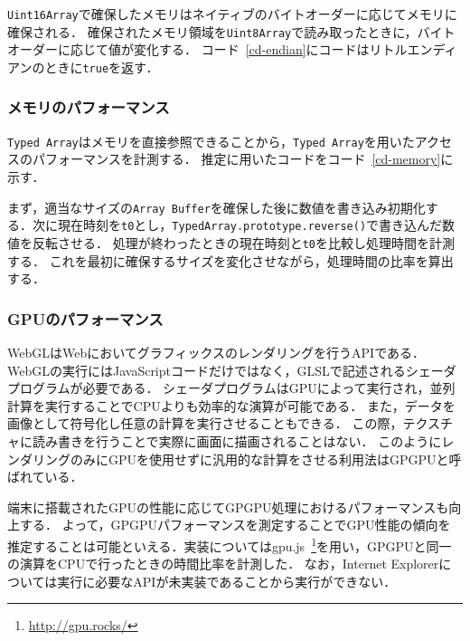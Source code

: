 

\texttt{Uint16Array}で確保したメモリはネイティブのバイトオーダーに応じてメモリに確保される．
確保されたメモリ領域を\texttt{Uint8Array}で読み取ったときに，バイトオーダーに応じて値が変化する．
コード~\ref{cd-endian}にコードはリトルエンディアンのときに\texttt{true}を返す．

\subsubsection{メモリのパフォーマンス}
\texttt{Typed Array}はメモリを直接参照できることから，\texttt{Typed Array}を用いたアクセスのパフォーマンスを計測する．
推定に用いたコードをコード~\ref{cd-memory}に示す．



まず，適当なサイズの\texttt{Array Buffer}を確保した後に数値を書き込み初期化する．次に現在時刻を\texttt{t0}とし，\texttt{TypedArray.prototype.reverse()}で書き込んだ数値を反転させる．
処理が終わったときの現在時刻と\texttt{t0}を比較し処理時間を計測する．
これを最初に確保するサイズを変化させながら，処理時間の比率を算出する．

\subsubsection{GPUのパフォーマンス}
WebGLはWebにおいてグラフィックスのレンダリングを行うAPIである．
WebGLの実行にはJavaScriptコードだけではなく，GLSLで記述されるシェーダプログラムが必要である．
シェーダプログラムはGPUによって実行され，並列計算を実行することでCPUよりも効率的な演算が可能である．
また，データを画像として符号化し任意の計算を実行させることもできる．
この際，テクスチャに読み書きを行うことで実際に画面に描画されることはない．
このようにレンダリングのみにGPUを使用せずに汎用的な計算をさせる利用法はGPGPUと呼ばれている．

端末に搭載されたGPUの性能に応じてGPGPU処理におけるパフォーマンスも向上する．
よって，GPGPUパフォーマンスを測定することでGPU性能の傾向を推定することは可能といえる．実装についてはgpu.js~\footnote{\url{http://gpu.rocks/}}を用い，GPGPUと同一の演算をCPUで行ったときの時間比率を計測した．
なお，Internet Explorerについては実行に必要なAPIが未実装であることから実行ができない．